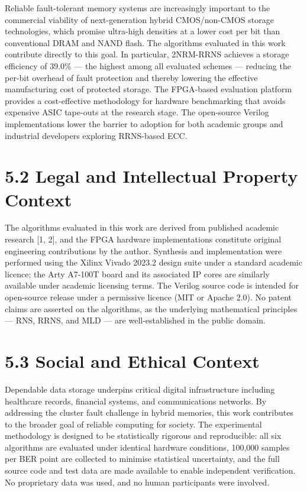 \documentclass[
  12pt,
  a4paper]{report}
\begin{document}
Reliable fault-tolerant memory systems are increasingly important to the
commercial viability of next-generation hybrid CMOS/non-CMOS storage
technologies, which promise ultra-high densities at a lower cost per bit
than conventional DRAM and NAND flash. The algorithms evaluated in this
work contribute directly to this goal. In particular, 2NRM-RRNS achieves
a storage efficiency of 39.0\% --- the highest among all evaluated
schemes --- reducing the per-bit overhead of fault protection and
thereby lowering the effective manufacturing cost of protected storage.
The FPGA-based evaluation platform provides a cost-effective methodology
for hardware benchmarking that avoids expensive ASIC tape-outs at the
research stage. The open-source Verilog implementations lower the
barrier to adoption for both academic groups and industrial developers
exploring RRNS-based ECC.

\section{5.2 Legal and Intellectual Property
Context}\label{legal-and-intellectual-property-context}

The algorithms evaluated in this work are derived from published
academic research {[}1, 2{]}, and the FPGA hardware implementations
constitute original engineering contributions by the author. Synthesis
and implementation were performed using the Xilinx Vivado 2023.2 design
suite under a standard academic licence; the Arty A7-100T board and its
associated IP cores are similarly available under academic licensing
terms. The Verilog source code is intended for open-source release under
a permissive licence (MIT or Apache 2.0). No patent claims are asserted
on the algorithms, as the underlying mathematical principles --- RNS,
RRNS, and MLD --- are well-established in the public domain.

\section{5.3 Social and Ethical
Context}\label{social-and-ethical-context}

Dependable data storage underpins critical digital infrastructure
including healthcare records, financial systems, and communications
networks. By addressing the cluster fault challenge in hybrid memories,
this work contributes to the broader goal of reliable computing for
society. The experimental methodology is designed to be statistically
rigorous and reproducible: all six algorithms are evaluated under
identical hardware conditions, 100,000 samples per BER point are
collected to minimise statistical uncertainty, and the full source code
and test data are made available to enable independent verification. No
proprietary data was used, and no human participants were involved.
\end{document}
